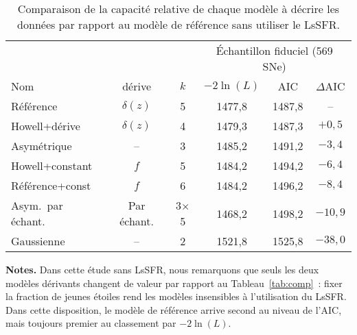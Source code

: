 \documentclass[../main/main.tex]{subfiles}
\begin{document}
\begin{table}[ht!]
    \centerfloat
    \begin{threeparttable}
        \caption[Comparaison de la capacité relative de chaque modèle à décrire
        les données par rapport au modèle de référence sans utiliser le
        LsSFR]{Comparaison de la capacité relative de chaque modèle à décrire
            les données par rapport au modèle de référence sans utiliser le
        LsSFR.}\label{tab:comp_zonly}
        \begin{tabular}{lccccc}
            \toprule
            & & & \multicolumn{3}{c}{Échantillon fiduciel (569 SNe)} \\
            \cmidrule(lr){4-6}
            Nom & dérive & $k$ &
            $-2\ln(L)$ & AIC & $\Delta$AIC\\
            \midrule
            Référence & $\delta(z)$ & 5
            & 1477,8 & 1487,8 & --
            \\
            Howell+dérive & $\delta(z)$ & 4
            & 1479,3 & 1487,3 & $+0,5$
            \\
            Asymétrique & -- & 3
            & 1485,2 & 1491,2 & $-3,4$
            \\
            Howell+constant & $f$ & 5
            & 1484,2 & 1494,2 & $-6,4$
            \\
            Référence+const & $f$ & 6
            & 1484,2 & 1496,2 & $-8,4$
            \\
            Asym.\ par échant. & Par échant. & 3$\times$5
            & 1468,2 & 1498,2  & $-10,9$
            \\
            Gaussienne & -- & 2
            & 1521,8 & 1525,8 & $-38,0$
            \\
            \bottomrule
        \end{tabular}
        \begin{tablenotes}[flushleft]
            \item\small \textbf{\hspace{-3.2pt}Notes.} Dans cette étude sans
                LsSFR, nous remarquons que seuls les deux modèles dérivants
                changent de valeur par rapport au Tableau~\ref{tab:comp}~: fixer
                la fraction de jeunes étoiles rend les modèles insensibles à
                l'utilisation du LsSFR. Dans cette disposition, le modèle de
                référence arrive second au niveau de l'AIC, mais toujours
                premier au classement par $-2\ln(L)$.
        \end{tablenotes}
    \end{threeparttable}
\end{table}
\end{document}
